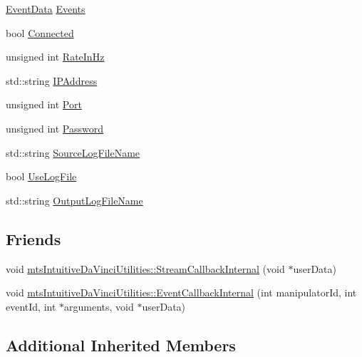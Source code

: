 \begin{DoxyCompactItemize}
\item 
\hyperlink{classmts_intuitive_da_vinci_1_1_event_data}{Event\-Data} \hyperlink{classmts_intuitive_da_vinci_adbe39e510898b80b04aac001722dc6fd}{Events}
\item 
bool \hyperlink{classmts_intuitive_da_vinci_a92486c3be7e1f07ef72df2f00556a5c7}{Connected}
\item 
unsigned int \hyperlink{classmts_intuitive_da_vinci_a1780b24f6582c60ff94f2e1d03ef7060}{Rate\-In\-Hz}
\item 
std\-::string \hyperlink{classmts_intuitive_da_vinci_aa5fb5d66628f24155b54300b3b3ed2b2}{I\-P\-Address}
\item 
unsigned int \hyperlink{classmts_intuitive_da_vinci_a62f779011990ec7e02ddc7800d933e23}{Port}
\item 
unsigned int \hyperlink{classmts_intuitive_da_vinci_a91a1a1c9fd5b0e0717257aa00c29c687}{Password}
\item 
std\-::string \hyperlink{classmts_intuitive_da_vinci_abd697468b4bd68e40664e73ca6af5692}{Source\-Log\-File\-Name}
\item 
bool \hyperlink{classmts_intuitive_da_vinci_a19a2398dbc1a8369da7295119fb8abbc}{Use\-Log\-File}
\item 
std\-::string \hyperlink{classmts_intuitive_da_vinci_a15ff830a81df5f1a4567de780f88e929}{Output\-Log\-File\-Name}
\end{DoxyCompactItemize}
\subsection*{Friends}
\begin{DoxyCompactItemize}
\item 
void \hyperlink{classmts_intuitive_da_vinci_ad910bb121d5d461c63287b041e77cae0}{mts\-Intuitive\-Da\-Vinci\-Utilities\-::\-Stream\-Callback\-Internal} (void $\ast$user\-Data)
\item 
void \hyperlink{classmts_intuitive_da_vinci_ac72f3d23f2cccf30b98148161cda75e5}{mts\-Intuitive\-Da\-Vinci\-Utilities\-::\-Event\-Callback\-Internal} (int manipulator\-Id, int event\-Id, int $\ast$arguments, void $\ast$user\-Data)
\end{DoxyCompactItemize}
\subsection*{Additional Inherited Members}


